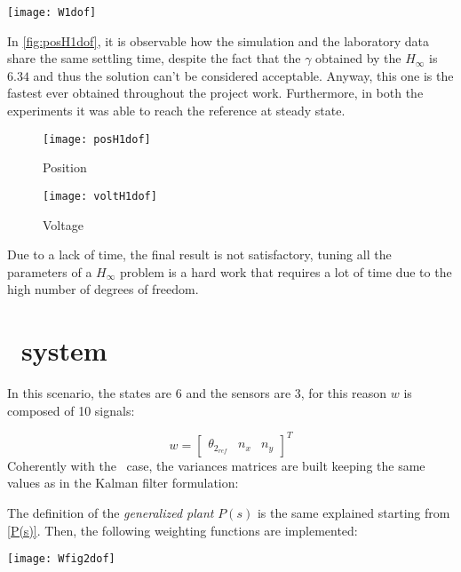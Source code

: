 \begin{figure*}[h]
	\centering
	\texttt{[image: W1dof]}
	\caption{Weighting functions}
\end{figure*}

 In \cref{fig:posH1dof}, it is observable how the simulation and the laboratory data share the same settling time, despite the fact that the $\gamma$ obtained by the $H_\infty$ is $6.34$ and thus the solution can't be considered acceptable. Anyway, this one is the fastest ever obtained throughout the project work. Furthermore, in both the experiments it was able to reach the reference at steady state.
 
 \begin{figure*}[h]
 	\centering
 	\begin{subfigure}{0.5\columnwidth}
 		\texttt{[image: posH1dof]}
 		\caption{Position}
 	\end{subfigure}
 	\begin{subfigure}{0.45\columnwidth}
 		\texttt{[image: voltH1dof]}
 		\caption{Voltage}
 	\end{subfigure}
 	\caption{Position step response}
 	\label{fig:posH1dof}
 \end{figure*}

Due to a lack of time, the final result is not satisfactory, tuning all the parameters of a $H_\infty$ problem is a hard work that requires a lot of time due to the high number of degrees of freedom. 
\newpage
\section{\twodof\ system}
In this scenario, the states are 6 and the sensors are 3, for this reason $w$ is composed of 10 signals:

\begin{equation}
	w =
	\begin{bmatrix}
		\theta_{2_{ref}} & n_x & n_y
	\end{bmatrix}^T
\end{equation}
Coherently with the \onedof~case, the variances matrices are built keeping the same values as in the Kalman filter formulation:

The definition of the \textit{generalized plant} $P(s)$ is the same explained starting from \cref{P(s)}. Then, the following weighting functions are implemented:

\begin{figure*}[h]
	\centering
	\texttt{[image: Wfig2dof]}
	\caption{Weighting functions scheme}
	\label{Weighting functions scheme2dof}
\end{figure*}

